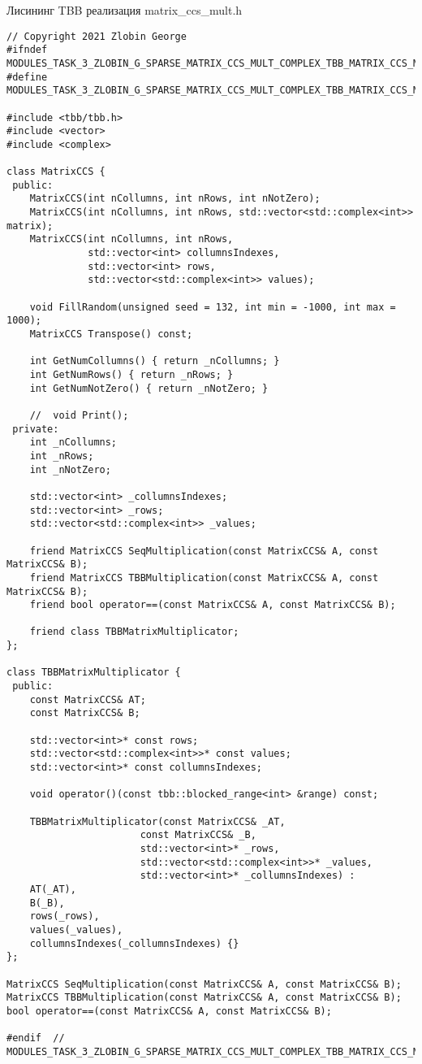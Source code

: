 \documentclass{report}
\begin{document}
Лисининг TBB реализация matrix\_ccs\_mult.h
\begin{lstlisting}
// Copyright 2021 Zlobin George
#ifndef MODULES_TASK_3_ZLOBIN_G_SPARSE_MATRIX_CCS_MULT_COMPLEX_TBB_MATRIX_CCS_MULT_H_
#define MODULES_TASK_3_ZLOBIN_G_SPARSE_MATRIX_CCS_MULT_COMPLEX_TBB_MATRIX_CCS_MULT_H_

#include <tbb/tbb.h>
#include <vector>
#include <complex>

class MatrixCCS {
 public:
    MatrixCCS(int nCollumns, int nRows, int nNotZero);
    MatrixCCS(int nCollumns, int nRows, std::vector<std::complex<int>> matrix);
    MatrixCCS(int nCollumns, int nRows,
              std::vector<int> collumnsIndexes,
              std::vector<int> rows,
              std::vector<std::complex<int>> values);

    void FillRandom(unsigned seed = 132, int min = -1000, int max = 1000);
    MatrixCCS Transpose() const;

    int GetNumCollumns() { return _nCollumns; }
    int GetNumRows() { return _nRows; }
    int GetNumNotZero() { return _nNotZero; }

    //  void Print();
 private:
    int _nCollumns;
    int _nRows;
    int _nNotZero;

    std::vector<int> _collumnsIndexes;
    std::vector<int> _rows;
    std::vector<std::complex<int>> _values;

    friend MatrixCCS SeqMultiplication(const MatrixCCS& A, const MatrixCCS& B);
    friend MatrixCCS TBBMultiplication(const MatrixCCS& A, const MatrixCCS& B);
    friend bool operator==(const MatrixCCS& A, const MatrixCCS& B);

    friend class TBBMatrixMultiplicator;
};

class TBBMatrixMultiplicator {
 public:
    const MatrixCCS& AT;
    const MatrixCCS& B;

    std::vector<int>* const rows;
    std::vector<std::complex<int>>* const values;
    std::vector<int>* const collumnsIndexes;

    void operator()(const tbb::blocked_range<int> &range) const;

    TBBMatrixMultiplicator(const MatrixCCS& _AT,
                       const MatrixCCS& _B,
                       std::vector<int>* _rows,
                       std::vector<std::complex<int>>* _values,
                       std::vector<int>* _collumnsIndexes) :
    AT(_AT),
    B(_B),
    rows(_rows),
    values(_values),
    collumnsIndexes(_collumnsIndexes) {}
};

MatrixCCS SeqMultiplication(const MatrixCCS& A, const MatrixCCS& B);
MatrixCCS TBBMultiplication(const MatrixCCS& A, const MatrixCCS& B);
bool operator==(const MatrixCCS& A, const MatrixCCS& B);

#endif  // MODULES_TASK_3_ZLOBIN_G_SPARSE_MATRIX_CCS_MULT_COMPLEX_TBB_MATRIX_CCS_MULT_H_

\end{lstlisting}
\end{document}
